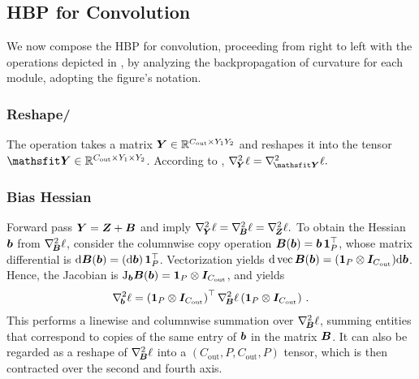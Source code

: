 \subsection{HBP for Convolution}\label{hbp::subsec:hbpConvolutions}
We now compose the HBP for convolution, proceeding from right to left with the
operations depicted in , by analyzing the
backpropagation of curvature for each module, adopting the figure's notation.

\subsubsection{Reshape/}

The  operation takes a matrix ${\bm{Y}} \in
\mathbb{R}^{C_\text{out} \times Y_1 Y_2}$ and reshapes it into the tensor $\tY
\in \mathbb{R}^{C_\text{out} \times Y_1 \times Y_2}$. According to
,
\begin{math}
  \gradsquared{\mY}\ell = \gradsquared{\tY}\ell. %
\end{math}

\subsubsection{Bias Hessian}

Forward pass ${\bm{Y}} = {\bm{Z}} + {\bm{B}}$ and  imply
\begin{math}
  \gradsquared{\mY}\ell = \gradsquared{\mB}\ell = \gradsquared{\mZ}\ell. %
\end{math}
To obtain the Hessian \wrt ${\bm{b}}$ from $\nabla_{\!{{\bm{B}}}}^{2}\ell$, consider the
columnwise copy operation ${\bm{B}}({\bm{b}}) = {\bm{b}} \, {\mathbf{1}}_P^\top$, whose matrix
differential is $\mathrm{d} {\bm{B}}({\bm{b}}) = (\mathrm{d} {\bm{b}})\, {\mathbf{1}}_P^\top$.
Vectorization yields $\mathrm{d} \operatorname{vec} {\bm{B}}({\bm{b}}) = ({\mathbf{1}}_P \otimes
{\bm{I}}_{C_\text{out}}) \mathrm{d} {\bm{b}}$. Hence, the Jacobian is $\mathrm{J}_{{\bm{b}}} {\bm{B}}({\bm{b}}) =
{\mathbf{1}}_{P} \otimes {\bm{I}}_{C_\text{out}}$, and
 yields
\begin{align*}
  \nabla_{\!{{\bm{b}}}}^{2}\ell
  =
  \left( {\mathbf{1}}_P \otimes {\bm{I}}_{C_\text{out}} \right)^\top
  \nabla_{\!{{\bm{B}}}}^{2}\ell
  \left({\mathbf{1}}_P \otimes {\bm{I}}_{C_\text{out}} \right)\,.
\end{align*}
This performs a linewise and columnwise summation over $\nabla_{\!{{\bm{B}}}}^{2}\ell$,
summing entities that correspond to copies of the same entry of ${\bm{b}}$ in the
matrix ${\bm{B}}$. It can also be regarded as a reshape of $\nabla_{\!{{\bm{B}}}}^{2}\ell$
into a $(C_\text{out}, P, C_\text{out}, P)$ tensor, which is then contracted
over the second and fourth axis.


